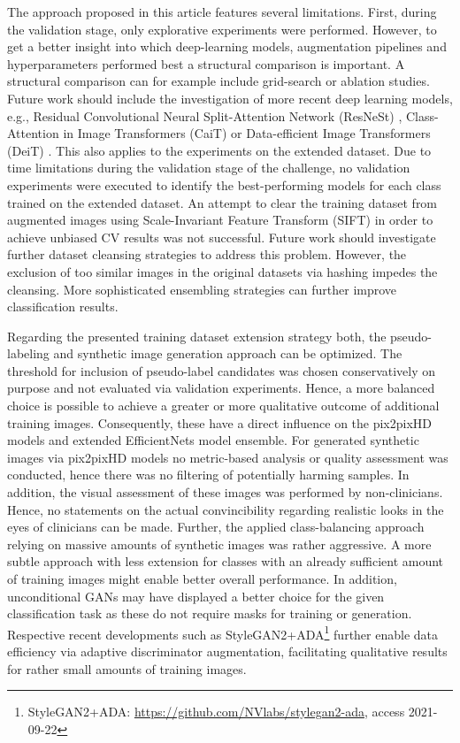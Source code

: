 \documentclass[runningheads]{llncs}
\begin{document}
The approach proposed in this article features several limitations. First, during the validation stage, only explorative experiments were performed. However, to get a better insight into which deep-learning models, augmentation pipelines and hyperparameters performed best a structural comparison is important. A structural comparison can for example include grid-search or ablation studies. Future work should include the investigation of more recent deep learning models, e.g., Residual Convolutional Neural Split-Attention Network (ResNeSt) \cite{ResNest}, Class-Attention in Image Transformers (CaiT) \cite{CaiT} or Data-efficient Image Transformers (DeiT) \cite{Deit}. This also applies to the experiments on the extended dataset. Due to time limitations during the validation stage of the challenge, no validation experiments were executed to identify the best-performing models for each class trained on the extended dataset. An attempt to clear the training dataset from augmented images using Scale-Invariant Feature Transform (SIFT) \cite{10.1023/b:visi.0000029664.99615.94} in order to achieve unbiased CV results was not successful. Future work should investigate further dataset cleansing strategies to address this problem. However, the exclusion of too similar images in the original datasets via hashing impedes the cleansing. More sophisticated ensembling strategies can further improve classification results.

Regarding the presented training dataset extension strategy both, the pseudo-labeling and synthetic image generation approach can be optimized. The threshold for inclusion of pseudo-label candidates was chosen conservatively on purpose and not evaluated via validation experiments. Hence, a more balanced choice is possible to achieve a greater or more qualitative outcome of additional training images. Consequently, these have a direct influence on the pix2pixHD models and extended EfficientNets model ensemble. For generated synthetic images via pix2pixHD models no metric-based analysis or quality assessment was conducted, hence there was no filtering of potentially harming samples. In addition, the visual assessment of these images was performed by non-clinicians. Hence, no statements on the actual convincibility regarding realistic looks in the eyes of clinicians can be made. Further, the applied class-balancing approach relying on massive amounts of synthetic images was rather aggressive. A more subtle approach with less extension for classes with an already sufficient amount of training images might enable better overall performance. In addition, unconditional GANs may have displayed a better choice for the given classification task as these do not require masks for training or generation. Respective recent developments such as StyleGAN2+ADA\footnote{StyleGAN2+ADA: \url{https://github.com/NVlabs/stylegan2-ada}, access 2021-09-22} \cite{karras2020stylegan2ada} further enable data efficiency via adaptive discriminator augmentation, facilitating qualitative results for rather small amounts of training images.
\end{document}
